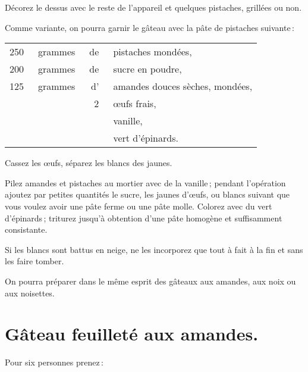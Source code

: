 Décorez le dessus avec le reste de l'appareil et quelques pistaches, grillées ou non.

\sk

Comme variante, on pourra garnir le gâteau avec la pâte de pistaches suivante :

\footnotesize
\begin{longtable}{rrrp{16em}}
    250 & grammes & de & pistaches mondées,                                                               \\
    200 & grammes & de & sucre en poudre,                                                                 \\
    125 & grammes & d' & amandes douces sèches, mondées,                                                  \\
        &         &  2 & œufs frais,                                                                      \\
        &         &    & vanille,                                                                         \\
        &         &    & vert d'épinards.                                                                 \\
\end{longtable}
\normalsize

Cassez les œufs, séparez les blancs des jaunes.

Pilez amandes et pistaches au mortier avec de la vanille ; pendant l'opération
ajoutez par petites quantités le sucre, les jaunes d'œufs, {\mmm} ou
{\mmm} blancs suivant que vous voulez avoir une pâte ferme ou une pâte
molle. Colorez avec du vert d'épinards ; triturez jusqu'à obtention d'une pâte
homogène et suffisamment consistante.

Si les blancs sont battus en neige, ne les incorporez que tout à fait à la fin et
sans les faire tomber.

\sk

On pourra préparer dans le même esprit des gâteaux aux amandes, aux noix ou
aux noisettes.

\section*{\centering Gâteau feuilleté aux amandes.}
{}

Pour six personnes prenez :

